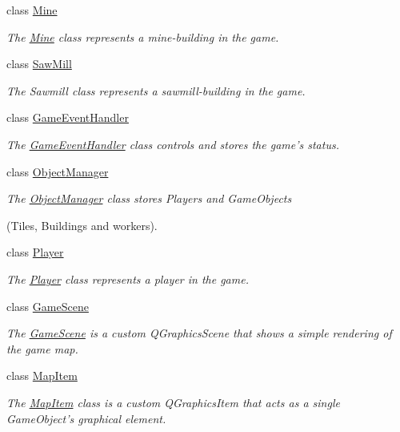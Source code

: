 \begin{DoxyCompactItemize}
\item 
class \hyperlink{classGame_1_1Mine}{Mine}
\begin{DoxyCompactList}\small\item\em The \hyperlink{classGame_1_1Mine}{Mine} class represents a mine-\/building in the game. \end{DoxyCompactList}\item 
class \hyperlink{classGame_1_1SawMill}{Saw\-Mill}
\begin{DoxyCompactList}\small\item\em The Sawmill class represents a sawmill-\/building in the game. \end{DoxyCompactList}\item 
class \hyperlink{classGame_1_1GameEventHandler}{Game\-Event\-Handler}
\begin{DoxyCompactList}\small\item\em The \hyperlink{classGame_1_1GameEventHandler}{Game\-Event\-Handler} class controls and stores the game's status. \end{DoxyCompactList}\item 
class \hyperlink{classGame_1_1ObjectManager}{Object\-Manager}
\begin{DoxyCompactList}\small\item\em The \hyperlink{classGame_1_1ObjectManager}{Object\-Manager} class stores Players and Game\-Objects \par
(Tiles, Buildings and workers). \end{DoxyCompactList}\item 
class \hyperlink{classGame_1_1Player}{Player}
\begin{DoxyCompactList}\small\item\em The \hyperlink{classGame_1_1Player}{Player} class represents a player in the game. \end{DoxyCompactList}\item 
class \hyperlink{classGame_1_1GameScene}{Game\-Scene}
\begin{DoxyCompactList}\small\item\em The \hyperlink{classGame_1_1GameScene}{Game\-Scene} is a custom Q\-Graphics\-Scene that shows a simple rendering of the game map. \end{DoxyCompactList}\item 
class \hyperlink{classGame_1_1MapItem}{Map\-Item}
\begin{DoxyCompactList}\small\item\em The \hyperlink{classGame_1_1MapItem}{Map\-Item} class is a custom Q\-Graphics\-Item that acts as a single Game\-Object's graphical element. \end{DoxyCompactList}\item 

\end{DoxyCompactItemize}
